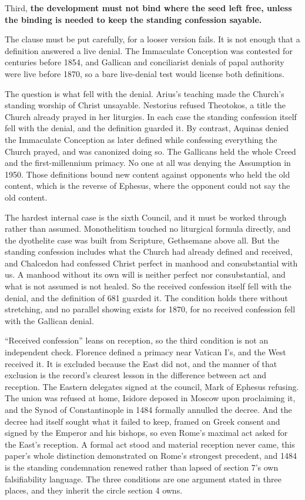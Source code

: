 \documentclass[11pt,twoside]{article}
\newcommand{\unit}[1]{\needspace{3\baselineskip}\par\medskip{\normalfont\bfseries\color{subhead}#1}\par\nobreak\smallskip}
\begin{document}
Third, \textbf{the development must not bind where the seed left free, unless the binding is needed to keep the standing confession sayable.}

The clause must be put carefully, for a looser version fails. It is not enough that a definition answered a live denial. The Immaculate Conception was contested for centuries before 1854, and Gallican and conciliarist denials of papal authority were live before 1870, so a bare live-denial test would license both definitions.

The question is what fell with the denial. Arius's teaching made the Church's standing worship of Christ unsayable. Nestorius refused Theotokos, a title the Church already prayed in her liturgies. In each case the standing confession itself fell with the denial, and the definition guarded it. By contrast, Aquinas denied the Immaculate Conception as later defined while confessing everything the Church prayed, and was canonized doing so. The Gallicans held the whole Creed and the first-millennium primacy. No one at all was denying the Assumption in 1950. Those definitions bound new content against opponents who held the old content, which is the reverse of Ephesus, where the opponent could not say the old content.

The hardest internal case is the sixth Council, and it must be worked through rather than assumed. Monothelitism touched no liturgical formula directly, and the dyothelite case was built from Scripture, Gethsemane above all. But the standing confession includes what the Church had already defined and received, and Chalcedon had confessed Christ perfect in manhood and consubstantial with us. A manhood without its own will is neither perfect nor consubstantial, and what is not assumed is not healed. So the received confession itself fell with the denial, and the definition of 681 guarded it. The condition holds there without stretching, and no parallel showing exists for 1870, for no received confession fell with the Gallican denial.



\unit{Florence, the demonstration.}
``Received confession'' leans on reception, so the third condition is not an independent check. Florence defined a primacy near Vatican I's, and the West received it. It is excluded because the East did not, and the manner of that exclusion is the record's clearest lesson in the difference between act and reception. The Eastern delegates signed at the council, Mark of Ephesus refusing. The union was refused at home, Isidore deposed in Moscow upon proclaiming it, and the Synod of Constantinople in 1484 formally annulled the decree. And the decree had itself sought what it failed to keep, framed on Greek consent and signed by the Emperor and his bishops, so even Rome's maximal act asked for the East's reception. A formal act stood and material reception never came, this paper's whole distinction demonstrated on Rome's strongest precedent, and 1484 is the standing condemnation renewed rather than lapsed of section 7's own falsifiability language. The three conditions are one argument stated in three places, and they inherit the circle section 4 owns.
\end{document}
